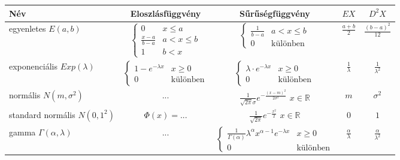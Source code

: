 \documentclass[tikz,12pt,margin=0px]{article}
\newcommand\ddfrac[2]{\frac{\displaystyle #1}{\displaystyle #2}}
\begin{document}
	\noindent \begin{tabular}{|p{3cm}|c|c|c|c|}
		\hline \textbf{Név} & \textbf{Eloszlásfüggvény} & \textbf{Sűrűségfüggvény} & \textbf{$EX$} & \textbf{$D^{2}X$} \\
		\hline egyenletes \newline $E(a,b)$
		& $\left\{\begin{array} {lr}
					0 & x \leq a \\
					\ddfrac{x-a}{b-a} &  a < x \leq b \\
					1 & b < x
			\end{array}\right.$
		& $\left\{\begin{array} {lr}
					\ddfrac{1}{b-a} & a < x \leq b \\
					0 & \text{különben}
			\end{array}\right.$
		& $\ddfrac{a+b}{2}$
		& $\ddfrac{(b-a)^2}{12}$ \\
		\hline exponenciális \newline $Exp(\lambda)$
		&  $\left\{\begin{array} {lr}
					1 - e^{-\lambda x} & x \geq 0 \\
					0 &  \text{különben}
			\end{array}\right.$
		&  $\left\{\begin{array} {lr}
					\lambda \cdot e^{-\lambda x} & x \geq 0 \\
					0 & \text{különben}
			\end{array}\right.$
		& $\ddfrac{1}{\lambda}$
		& $\ddfrac{1}{\lambda^{2}}$ \\
		\hline normális \newline $N(m,\sigma^2)$ & $...$ & $\ddfrac{1}{\sqrt{2 \pi}\sigma}e^{-\ddfrac{(x-m)^2}{2\sigma^2}}$ $x \in \mathbb{R}$ & $m$ & $\sigma^2$ \\
		\hline standard normális \newline $N(0,1^2)$ & $\Phi(x)=...$ & $\ddfrac{1}{\sqrt{2 \pi}}e^{-\ddfrac{x^2}{2}}$ $x \in \mathbb{R}$ & $0$ & $1$ \\
		\hline gamma \newline $\Gamma(\alpha,\lambda)$
		& $...$
		& $\left\{\begin{array} {lr}
					\ddfrac{1}{\Gamma(\alpha)}\lambda^{\alpha}x^{\alpha-1}e^{-\lambda x} & x \geq 0 \\
					0 & \text{különben}
			\end{array}\right.$
		& $\ddfrac{\alpha}{\lambda}$
		& $\ddfrac{\alpha}{\lambda^2}$ \\
		\hline
	\end{tabular}\\
\end{document}
